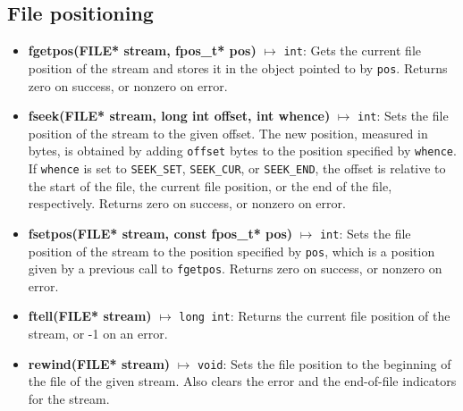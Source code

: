 \documentclass{report}
\begin{document}
    \bigbreak \noindent 
    \subsection{File positioning}
    \begin{itemize}
        \item \textbf{fgetpos(FILE* stream, fpos\_t* pos)} $\mapsto$ \texttt{int}: Gets the current file position of the stream and stores it in the object pointed to by \texttt{pos}. Returns zero on success, or nonzero on error.
        \item \textbf{fseek(FILE* stream, long int offset, int whence)} $\mapsto$ \texttt{int}: Sets the file position of the stream to the given offset. The new position, measured in bytes, is obtained by adding \texttt{offset} bytes to the position specified by \texttt{whence}. If \texttt{whence} is set to \texttt{SEEK\_SET}, \texttt{SEEK\_CUR}, or \texttt{SEEK\_END}, the offset is relative to the start of the file, the current file position, or the end of the file, respectively. Returns zero on success, or nonzero on error.
        \item \textbf{fsetpos(FILE* stream, const fpos\_t* pos)} $\mapsto$ \texttt{int}: Sets the file position of the stream to the position specified by \texttt{pos}, which is a position given by a previous call to \texttt{fgetpos}. Returns zero on success, or nonzero on error.
        \item \textbf{ftell(FILE* stream)} $\mapsto$ \texttt{long int}: Returns the current file position of the stream, or -1 on an error.
        \item \textbf{rewind(FILE* stream)} $\mapsto$ \texttt{void}: Sets the file position to the beginning of the file of the given stream. Also clears the error and the end-of-file indicators for the stream.
    \end{itemize}


    \bigbreak \noindent 
\end{document}
